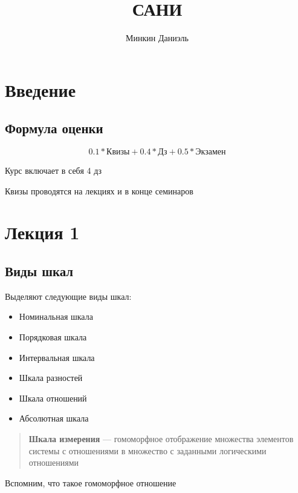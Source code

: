 \documentclass{article}
\title{САНИ}
\author{Минкин Даниэль}
\begin{document}
    \maketitle

    \tableofcontents %

    \section{Введение}

    \subsection{Формула оценки}

    \begin{equation}
        0.1 * \text{Квизы} + 0.4 * \text{Дз} + 0.5 * \text{Экзамен}
    \end{equation}

    Курс включает в себя 4 дз

    Квизы проводятся на лекциях и в конце семинаров

    \section{Лекция 1}

    \subsection{Виды шкал}

    Выделяют следующие виды шкал:

    \begin{itemize}
        \item Номинальная шкала
        \item Порядковая шкала
        \item Интервальная шкала
        \item Шкала разностей
        \item Шкала отношений
        \item Абсолютная шкала
    \end{itemize}

    \begin{quote}
        \textbf{Шкала измерения} --- гомоморфное отображение множества элементов системы с отношениями в множество с заданными логическими отношениями
    \end{quote}

    Вспомним, что такое гомоморфное отношение 
    
\end{document}
